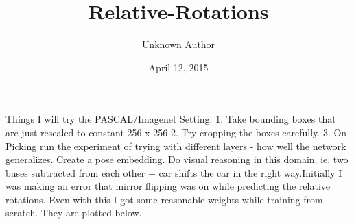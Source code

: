 \documentclass[letterpaper,10pt,english]{/usr/share/sphinx/texinputs/sphinxhowto}
\title{Relative-Rotations}
\date{April 12, 2015}
\author{Unknown Author}
\begin{document}
        
            \maketitle
        

        


        
        Things I will try the PASCAL/Imagenet Setting: 1. Take bounding boxes
that are just rescaled to constant 256 x 256 2. Try cropping the boxes
carefully. 3. On Picking run the experiment of trying with different
layers - how well the network generalizes. Create a pose embedding. Do
visual reasoning in this domain. ie. two buses subtracted from each
other + car shifts the car in the right way.Initially I was making an error that mirror flipping was on while
predicting the relative rotations. Even with this I got some reasonable
weights while training from scratch. They are plotted below.

\end{document}
